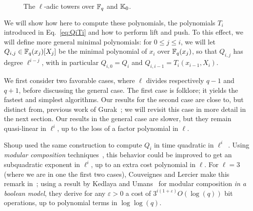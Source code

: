 \documentclass{sig-alternate}
\begin{document}
\begin{figure}[h]
  \centering
  \caption{The $\ell$-adic towers over $\mathbb{F}_q$ and $\mathbb{K}_0$.}
  \label{fig:ladic}
\end{figure}

We will show how here to compute these polynomials, the polynomials
$T_i$ introduced in Eq.~\eqref{eq:QiTi} and how to perform lift and
push.  To this effect, we will define more general minimal
polynomials: for $0 \le j \le i$, we will let $Q_{i,j} \in
\mathbb{F}_q(x_j)[X_j]$ be the minimal polynomial of $x_i$ over $\mathbb{F}_q(x_j)$,
so that $Q_{i,j}$ has degree $\ell^{i-j}$, with in particular
$Q_{i,0}=Q_i$ and $Q_{i,i-1}=T_i(x_{i-1},X_i)$.

We first consider two favorable cases, where $\ell$ divides
respectively $q-1$ and $q+1$, before discussing the general case. The
first case is folklore; it yields the fastest and simplest
algorithms. Our results for the second case are close to, but distinct
from, previous work of Gurak~\cite{gurak06}; we will revisit this case
in more detail in the next section. Our results in the general case
are slower, but they remain  quasi-linear in $\ell^i$, up to
the loss of a factor polynomial in $\ell$.

Shoup used the same construction to compute $Q_i$ in time quadratic in
$\ell^i$~\cite[Th.~11]{shoup94}.  Using {\em modular composition}
techniques~\cite[Ch.~12]{vzGG}, this behavior could be improved to get
an subquadratic exponent in $\ell^i$, up to an extra cost polynomial
in $\ell$.  For $\ell=3$ (where we are in one the first two cases),
Couveignes and Lercier make this remark
in~\cite[\S~2.4]{couveignes+lercier11}; using a result by Kedlaya and
Umans~\cite{KeUm11} for modular composition {\em in a boolean model},
they derive for any $\varepsilon > 0$ a cost of
$3^{i(1+\varepsilon)}O(\log(q))$ bit operations, up to 
polynomial terms in $\log\log(q)$.
\end{document}
